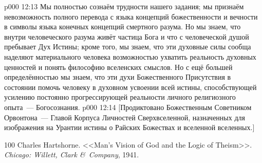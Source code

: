 \vs p000 12:13 Мы полностью сознаём трудности нашего задания; мы признаём невозможность полного перевода с языка концепций божественности и вечности в символы языка конечных концепций смертного разума. Но мы знаем, что внутри человеческого разума живёт частица Бога и что с человеческой душой пребывает Дух Истины; кроме того, мы знаем, что эти духовные силы сообща наделяют материального человека возможностью ухватить реальность духовных ценностей и понять философию вселенских смыслов. Но с ещё большей определённостью мы знаем, что эти духи Божественного Присутствия в состоянии помочь человеку в духовном усвоении всей истины, способствующей усилению постоянно прогрессирующей реальности личного религиозного опыта~--- Богосознания.
\vsetoff
\vs p000 12:14 [Продиктовано Божественным Советником Орвонтона~--- Главой Корпуса Личностей Сверхвселенной, назначенных для изображения на Урантии истины о Райских Божествах и вселенной вселенных.]
\quizlink
\begin{thebibliography}{100}
Charles Hartshorne.
{<<Man's Vision of God and the Logic of Theism>>.}
{\em Chicago: Willett, Clark \&\ Company}, 1941.
\end{thebibliography}
